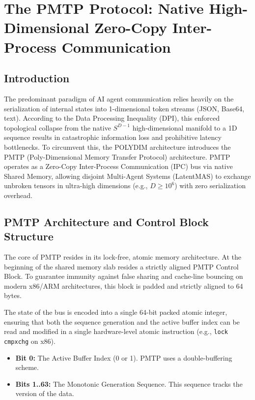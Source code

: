 \chapter{The PMTP Protocol: Native High-Dimensional Zero-Copy Inter-Process Communication}


\section{Introduction}

The predominant paradigm of AI agent communication relies heavily on the serialization of internal states into 1-dimensional token streams (JSON, Base64, text). According to the Data Processing Inequality (DPI), this enforced topological collapse from the native $S^{D-1}$ high-dimensional manifold to a 1D sequence results in catastrophic information loss and prohibitive latency bottlenecks. To circumvent this, the POLYDIM architecture introduces the PMTP (Poly-Dimensional Memory Transfer Protocol) architecture. PMTP operates as a Zero-Copy Inter-Process Communication (IPC) bus via native Shared Memory, allowing disjoint Multi-Agent Systems (LatentMAS) to exchange unbroken tensors in ultra-high dimensions (e.g., $D \ge 10^6$) with zero serialization overhead.

\section{PMTP Architecture and Control Block Structure}

The core of PMTP resides in its lock-free, atomic memory architecture. At the beginning of the shared memory slab resides a strictly aligned PMTP Control Block. To guarantee immunity against false sharing and cache-line bouncing on modern x86/ARM architectures, this block is padded and strictly aligned to 64 bytes.

The state of the bus is encoded into a single 64-bit packed atomic integer, ensuring that both the sequence generation and the active buffer index can be read and modified in a single hardware-level atomic instruction (e.g., \texttt{lock cmpxchg} on x86).

\begin{itemize}
    \item \textbf{Bit 0:} The Active Buffer Index (0 or 1). PMTP uses a double-buffering scheme.
    \item \textbf{Bits 1..63:} The Monotonic Generation Sequence. This sequence tracks the version of the data.
\end{itemize}

